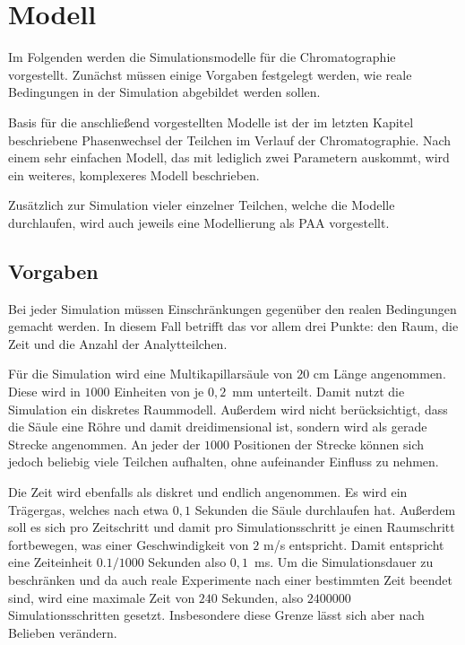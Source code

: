 \chapter{Modell} %
\label{chapter:mod}
Im Folgenden werden die Simulationsmodelle für die Chromatographie vorgestellt. 
Zunächst müssen einige Vorgaben festgelegt werden, wie reale Bedingungen in der Simulation abgebildet werden sollen.

Basis für die anschließend vorgestellten Modelle ist der im letzten Kapitel beschriebene Phasenwechsel der Teilchen im Verlauf der Chromatographie. Nach einem sehr einfachen Modell, das mit lediglich zwei Parametern auskommt, wird ein weiteres, komplexeres Modell beschrieben.

Zusätzlich zur Simulation vieler einzelner Teilchen, welche die Modelle durchlaufen, wird auch jeweils eine Modellierung als PAA vorgestellt.

\section{Vorgaben}
Bei jeder Simulation müssen Einschränkungen gegenüber den realen Bedingungen gemacht werden. In diesem Fall betrifft das vor allem drei Punkte: den Raum, die Zeit und die Anzahl der Analytteilchen.

Für die Simulation wird eine Multikapillarsäule von $20$ cm Länge angenommen. Diese wird in $1000$ Einheiten von je $0,2$\, mm unterteilt. Damit nutzt die Simulation ein diskretes Raummodell. Außerdem wird nicht berücksichtigt, dass die Säule eine Röhre und damit dreidimensional ist, sondern wird als gerade Strecke angenommen. An jeder der $1000$ Positionen der Strecke können sich jedoch beliebig viele Teilchen aufhalten, ohne aufeinander Einfluss zu nehmen.

Die Zeit wird ebenfalls als diskret und endlich angenommen. Es wird ein Trägergas, welches nach etwa $0,1$ Sekunden die Säule durchlaufen hat. Außerdem soll es sich pro Zeitschritt und damit pro Simulationsschritt je einen Raumschritt fortbewegen, was einer Geschwindigkeit von $2$ m/s entspricht. Damit entspricht eine Zeiteinheit $0.1/1000$ Sekunden also $0,1$\, ms. Um die Simulationsdauer zu beschränken und da auch reale Experimente nach einer bestimmten Zeit beendet sind, wird eine maximale Zeit von $240$ Sekunden, also $2400000$ Simulationsschritten gesetzt. Insbesondere diese Grenze lässt sich aber nach Belieben verändern.

